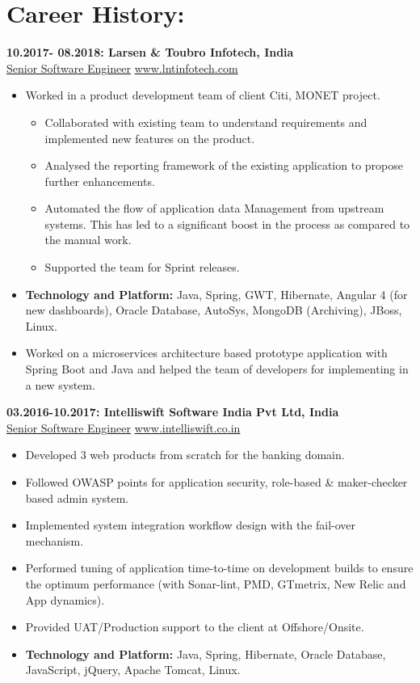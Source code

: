 \documentclass{article}
\begin{document}
\section{Career History:}
\textbf{10.2017- 08.2018: \hfill Larsen \& Toubro Infotech, India \\}
\underline{Senior Software Engineer} \hfill \href{www.lntinfotech.com}{www.lntinfotech.com}
\begin{itemize}
	\itemsep0em
	\item Worked in a product development team of client Citi, MONET project.
	\begin{itemize}
		\itemsep0em
		\item Collaborated with existing team to understand requirements and implemented new features on the product.
		\item Analysed the reporting framework of the existing application to propose further enhancements.
		\item Automated the flow of application data Management from upstream systems. This has led to a significant boost in the process as compared to the manual work.
		\item Supported the team for Sprint releases.
	\end{itemize}
	\item \textbf{Technology and Platform:} Java, Spring, GWT, Hibernate, Angular 4 (for new dashboards), Oracle Database, AutoSys, MongoDB (Archiving), JBoss, Linux.
	\item Worked on a microservices architecture based prototype application with Spring Boot and Java and helped the team of developers for implementing in a new system.

\end{itemize}
\textbf{03.2016-10.2017: \hfill Intelliswift Software India Pvt Ltd, India\\}
\underline{Senior Software Engineer} \hfill \href{www.intelliswift.co.in}{www.intelliswift.co.in}
\begin{itemize}
	\itemsep0em
\item Developed 3 web products from scratch for the banking domain.
\item Followed OWASP points for application security, role-based \& maker-checker based admin system.
\item Implemented system integration workflow design with the fail-over mechanism.
\item Performed tuning of application time-to-time on development builds to ensure the optimum performance (with Sonar-lint, PMD, GTmetrix, New Relic and App dynamics).
\item Provided UAT/Production support to the client at Offshore/Onsite.
\item \textbf{Technology and Platform:} Java, Spring, Hibernate, Oracle Database, JavaScript, jQuery, Apache Tomcat, Linux.
\end{itemize}
\end{document}
